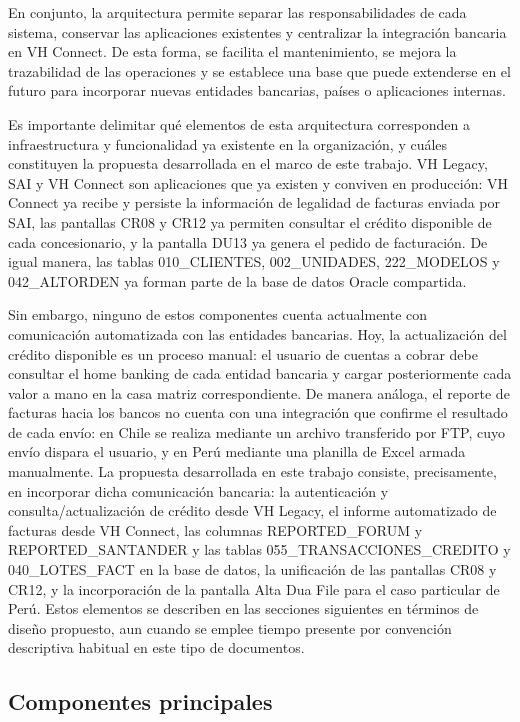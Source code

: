 En conjunto, la arquitectura permite separar las responsabilidades de cada sistema, conservar las aplicaciones existentes y centralizar la integración bancaria en VH Connect. De esta forma, se facilita el mantenimiento, se mejora la trazabilidad de las operaciones y se establece una base que puede extenderse en el futuro para incorporar nuevas entidades bancarias, países o aplicaciones internas.

Es importante delimitar qué elementos de esta arquitectura corresponden a infraestructura y funcionalidad ya existente en la organización, y cuáles constituyen la propuesta desarrollada en el marco de este trabajo. VH Legacy, SAI y VH Connect son aplicaciones que ya existen y conviven en producción: VH Connect ya recibe y persiste la información de legalidad de facturas enviada por SAI, las pantallas CR08 y CR12 ya permiten consultar el crédito disponible de cada concesionario, y la pantalla DU13 ya genera el pedido de facturación. De igual manera, las tablas 010\_CLIENTES, 002\_UNIDADES, 222\_MODELOS y 042\_ALTORDEN ya forman parte de la base de datos Oracle compartida.

Sin embargo, ninguno de estos componentes cuenta actualmente con comunicación automatizada con las entidades bancarias. Hoy, la actualización del crédito disponible es un proceso manual: el usuario de cuentas a cobrar debe consultar el home banking de cada entidad bancaria y cargar posteriormente cada valor a mano en la casa matriz correspondiente. De manera análoga, el reporte de facturas hacia los bancos no cuenta con una integración que confirme el resultado de cada envío: en Chile se realiza mediante un archivo transferido por FTP, cuyo envío dispara el usuario, y en Perú mediante una planilla de Excel armada manualmente. La propuesta desarrollada en este trabajo consiste, precisamente, en incorporar dicha comunicación bancaria: la autenticación y consulta/actualización de crédito desde VH Legacy, el informe automatizado de facturas desde VH Connect, las columnas REPORTED\_FORUM y REPORTED\_SANTANDER y las tablas 055\_TRANSACCIONES\_CREDITO y 040\_LOTES\_FACT en la base de datos, la unificación de las pantallas CR08 y CR12, y la incorporación de la pantalla Alta Dua File para el caso particular de Perú. Estos elementos se describen en las secciones siguientes en términos de diseño propuesto, aun cuando se emplee tiempo presente por convención descriptiva habitual en este tipo de documentos.

\subsection{Componentes principales}

